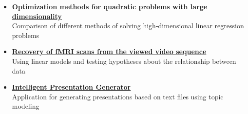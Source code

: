 \documentclass[12pt]{moderncv}
\begin{document}
        \begin{itemize}
            \item \href{https://github.com/nekitbrain/Optimization-Methods}{\textbf{Optimization methods for quadratic problems with large dimensionality}}\\
            Comparison of different methods of solving high-dimensional linear regression problems
            \item \href{https://github.com/intsystems/2023-Project-112}{\textbf{Recovery of fMRI scans from the viewed video sequence}}\\
            Using linear models and testing hypotheses about the relationship between data
            \item \href{https://github.com/nekitbrain/Intelligent-Presentation-Generator}{\textbf{Intelligent Presentation Generator}}\\
            Application for generating presentations based on text files using topic modeling
        \end{itemize}

    
\end{document}

